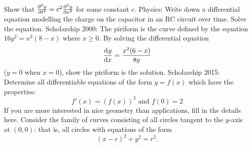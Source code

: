 \begin{questions}
            Show that $ \pd[2]{y}{t} = c^2 \pd[2]{y}{x} $ for some constant $ c $.
  \questioS Physics: Write down a differential equation modelling the charge on the capacitor in an RC circuit over time. Solve the equation.
  \questioS Scholarship 2000: The piriform is the curve defined by the equation $ 16y^2 = x^3(8-x) $ where $ x \geq 0 $.
            By solving the differential equation
            \begin{displaymath}
              \dod{y}{x} = \frac{x^2(6-x)}{8y}
            \end{displaymath}
            ($ y = 0 $ when $ x = 0 $), show the piriform is the solution.
  \questioS Scholarship 2015: Determine all differentiable equations of the form $ y = f(x) $ which have the properties:
    \begin{displaymath}
      f'(x) = (f(x))^3 \text{ and } f(0) = 2
    \end{displaymath}
  \questioO If you are more interested in nice geometry than applications, fill in the details here. Consider the family
            of curves consisting of all circles tangent to the $ y$-axis at $ (0,0) $: that is, all circles with equations
            of the form
            \begin{displaymath}
              (x - r)^2 + y^2 = r^2.
            \end{displaymath}
\end{questions}

